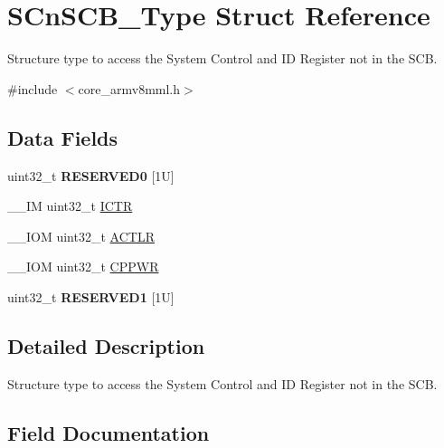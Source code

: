 \hypertarget{struct_s_cn_s_c_b___type}{}\section{S\+Cn\+S\+C\+B\+\_\+\+Type Struct Reference}
\label{struct_s_cn_s_c_b___type}


Structure type to access the System Control and ID Register not in the S\+CB.  




{\ttfamily \#include $<$core\+\_\+armv8mml.\+h$>$}

\subsection*{Data Fields}
\begin{DoxyCompactItemize}
\item 
\mbox{\label{struct_s_cn_s_c_b___type_a758b3cae751b227e20698256b6249dd4}} 
uint32\+\_\+t {\bfseries R\+E\+S\+E\+R\+V\+E\+D0} \mbox{[}1\+U\mbox{]}
\item 
\+\_\+\+\_\+\+IM uint32\+\_\+t \hyperlink{struct_s_cn_s_c_b___type_a34ec1d771245eb9bd0e3ec9336949762}{I\+C\+TR}
\item 
\+\_\+\+\_\+\+I\+OM uint32\+\_\+t \hyperlink{struct_s_cn_s_c_b___type_a13af9b718dde7481f1c0344f00593c23}{A\+C\+T\+LR}
\item 
\+\_\+\+\_\+\+I\+OM uint32\+\_\+t \hyperlink{struct_s_cn_s_c_b___type_a356efebfcbdaecaf1176e6cd86a60bf1}{C\+P\+P\+WR}
\item 
\mbox{\label{struct_s_cn_s_c_b___type_a0bce3f86e9f6e00085cf5a126ae201c6}} 
uint32\+\_\+t {\bfseries R\+E\+S\+E\+R\+V\+E\+D1} \mbox{[}1\+U\mbox{]}
\end{DoxyCompactItemize}


\subsection{Detailed Description}
Structure type to access the System Control and ID Register not in the S\+CB. 

\subsection{Field Documentation}
\mbox{\label{struct_s_cn_s_c_b___type_a13af9b718dde7481f1c0344f00593c23}} 

